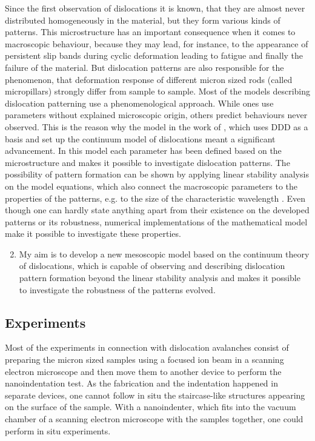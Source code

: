 \documentclass[a5paper,twoside,10pt]{article}
\begin{document}
Since the first observation of dislocations it is known, that they are almost never distributed homogeneously in the material, but they form various kinds of patterns. This microstructure has an important consequence when it comes to macroscopic behaviour, because they may lead, for instance, to the appearance of persistent slip bands during cyclic deformation leading to fatigue and finally the failure of the material. But dislocation patterns are also responsible for the phenomenon, that deformation response of different micron sized rods (called micropillars) strongly differ from sample to sample. Most of the models describing dislocation patterning use a phenomenological approach. While ones use parameters without explained microscopic origin, others predict behaviours never observed. This is the reason why the model in the work of \citet{PhysRevB.93.214110}, which uses DDD as a basis and set up the continuum model of dislocations meant a significant advancement. In this model each parameter has been defined based on the microstructure and makes it possible to investigate dislocation patterns\cite{PhysRevB.93.214110}. The possibility of pattern formation can be shown by applying linear stability analysis on the model equations, which also connect the macroscopic parameters to the properties of the patterns, e.g. to the size of the characteristic wavelength \cite{PhysRevB.93.214110}. Even though one can hardly state anything apart from their existence on the developed patterns or its robustness, numerical implementations of the mathematical model make it possible to investigate these properties.

\begin{enumerate}
\setcounter{enumi}{1}
\item My aim is to develop a new mesoscopic model based on the continuum theory of dislocations, which is capable of observing and describing dislocation pattern formation beyond the linear stability analysis and makes it possible to investigate the robustness of the patterns evolved.

\end{enumerate}

\subsection*{Experiments}
Most of the experiments in connection with dislocation avalanches consist of preparing the micron sized samples using a focused ion beam in a scanning electron microscope and then move them to another device to perform the nanoindentation test. As the fabrication and the indentation happened in separate devices, one cannot follow in situ the staircase-like structures appearing on the surface of the sample. With a nanoindenter, which fits into the vacuum chamber of a scanning electron microscope with the samples together, one could perform in situ experiments.
\end{document}
